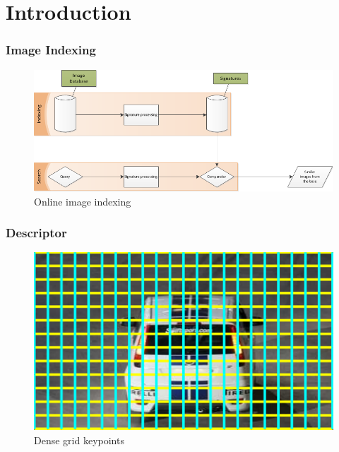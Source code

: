 \documentclass[xcolor=table]{beamer}
\begin{document}
\section{Introduction}
\begin{frame} \frametitle{Image Indexing}
   \begin{figure}[h]
        \centering
        \includegraphics[scale=0.35]{ImgIndx.png}
        \caption{Online image indexing}
        \label{fig:img_index}
    \end{figure}
\end{frame}


\begin{frame} \frametitle{Descriptor}
    \begin{figure}[h]
        \centering
        \includegraphics[scale=0.35]{dense_grid.png}
        \caption{Dense grid keypoints}
        \label{fig:img_densegrid}
    \end{figure}

\end{frame}
\end{document}
